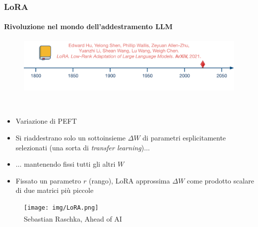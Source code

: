 %
\begin{frame}[t] \frametitle{LoRA}
	{\scriptsize
		\onslide<1->
            \framesubtitle{Rivoluzione nel mondo dell'addestramento LLM}
            \vspace*{-.5cm}
             \begin{minipage}[t]{\textwidth}
             	\begin{figure}[ht]
                    \centering
                    \includegraphics[width=\textwidth]{img/AI-timeline-2021.png}
                \end{figure}
            \end{minipage}
            \\\vspace*{.3cm}
	    	\begin{minipage}[t]{.35\textwidth}
                \begin{itemize}[leftmargin=10pt,align=right]
						\onslide<2->\item[\alert{\faArrowCircleRight}] Variazione di PEFT
						\onslide<3->\item[\alert{\faArrowCircleRight}] Si riaddestrano solo un sottoinsieme $\Delta W$ di parametri esplicitamente selezionati (una sorta di \emph{transfer learning})$\ldots$
						\onslide<4->\item[\alert{\faArrowCircleRight}] $\ldots$ mantenendo fissi tutti gli altri $W$
                        \item[\alert{\faArrowCircleRight}] Fissato un parametro $r$ (\alert{rango}), LoRA approssima $\Delta W$ come prodotto scalare di due matrici più piccole
                \end{itemize}
	    	\end{minipage}
    \hfill
        \begin{minipage}[t]{.60\textwidth}
            \begin{figure}[ht]
                \centering
                \texttt{[image: img/LoRA.png]}
                \\\textsuperscript{\textcopyright}Sebastian Raschka, Ahead of AI
            \end{figure}
        \end{minipage}
	}
\end{frame}
